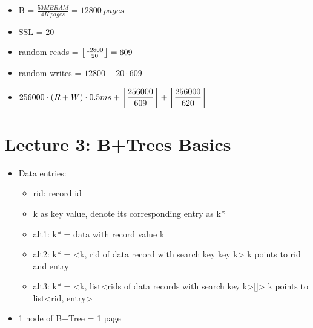 \documentclass{article}
\DeclarePairedDelimiter\ceil{\lceil}{\rceil}
\DeclarePairedDelimiter\floor{\lfloor}{\rfloor}
\begin{document}
\begin{itemize}
\begin{itemize}
\begin{itemize}
                \item B = $\frac{50MB RAM}{4K\ pages} = 12800\ pages$
                \item SSL = 20
                \item random reads = $\floor*{\frac{12800}{20}} = 609$
                \item random writes = $12800-20\cdot 609$
                \item $\displaystyle{256000\cdot (R+W)\cdot 0.5ms+{\ceil*{\frac{256000}{609}} + \ceil*{\frac{256000}{620}}}}$
            \end{itemize}
    \end{itemize}
\end{itemize}

\section{Lecture 3: B+Trees Basics}
\begin{itemize}
    \item Data entries:
        \begin{itemize}
            \item rid: record id
            \item k as key value, denote its corresponding entry as k*
            \item alt1: k* = data with record value k
            \item alt2: k* = <k, rid of data record with search key key k>
                \subitem k points to rid and entry
            \item alt3: k* = <k, list<rids of data records with search key k>[]>
                \subitem k points to list<rid, entry>
        \end{itemize}
    \item 1 node of B+Tree = 1 page
\end{itemize}
\end{document}

